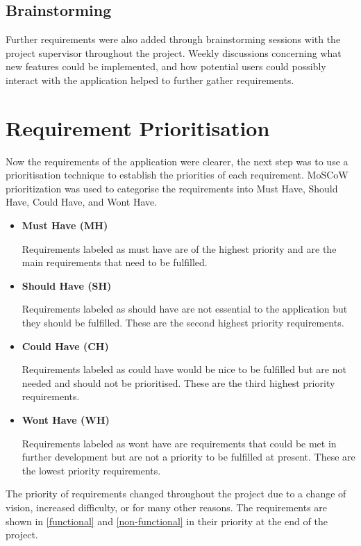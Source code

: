 \subsection{Brainstorming}
Further requirements were also added through brainstorming sessions with the project supervisor throughout the project. Weekly discussions concerning what new features could be implemented, and how potential users could possibly interact with the application helped to further gather requirements.
\section{Requirement Prioritisation}\label{reqPrior}
Now the requirements of the application were clearer, the next step was to use a prioritisation technique to establish the priorities of  each requirement. MoSCoW prioritization \cite{moscow} was used to categorise the requirements into Must Have, Should Have, Could Have, and Wont Have.
\begin{itemize}
    \item \textbf{Must Have (MH)} \par
    Requirements labeled as must have are of the highest priority and are the main requirements that need to be fulfilled. 
    \item \textbf{Should Have (SH)} \par
    Requirements labeled as should have are not essential to the application but they should be fulfilled. These are the second highest priority requirements. 
    \item \textbf{Could Have (CH)} \par
    Requirements labeled as could have would be nice to be fulfilled but are not needed and should not be prioritised. These are the third highest priority requirements. 
    \item \textbf{Wont Have (WH)} \par
    Requirements labeled as wont have are requirements that could be met in further development but are not a priority to be fulfilled at present. These are the lowest priority requirements. 
\end{itemize}
The priority of requirements changed throughout the project due to a change of vision, increased difficulty, or for many other reasons. The requirements are shown in \ref{functional} and \ref{non-functional} in their priority at the end of the project.
